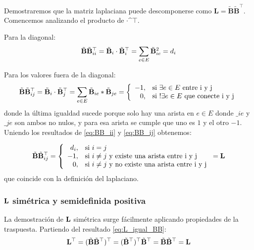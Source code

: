 \documentclass{article}
\begin{document}
Demostraremos que la matriz laplaciana puede descomponerse como $\mathbf{L}=\tilde{\mathbf{B}}\tilde{\mathbf{B}}^\top$. Comencemos analizando el producto de $\bm\cdot\bm^\top$.

Para la diagonal:
\begin{equation}
    \label{eq:BB_ii}
    \tilde{\mathbf{B}}\tilde{\mathbf{B}}^\top_{ii} = \tilde{\mathbf{B}}_i \cdot \tilde{\mathbf{B}}_i^\top = \sum_{e\in E} \tilde{\mathbf{B}}_{ie}^2 = d_i
\end{equation}

Para los valores fuera de la diagonal:
\begin{equation}
    \label{eq:BB_ij}
    \tilde{\mathbf{B}}\tilde{\mathbf{B}}^\top_{ij} = \tilde{\mathbf{B}}_i\cdot\tilde{\mathbf{B}}_j^\top = \sum_{e\in E} \tilde{\mathbf{B}}_{ie} * \tilde{\mathbf{B}}_{je} = \left\lbrace
    \begin{array}{r l}
        -1, & \text{si $\exists e\in E$ entre i y j}         \\
        0,  & \text{si $!\exists e \in E$ que conecte i y j}
    \end{array}
    \right.
\end{equation}
donde la última igualdad sucede porque solo hay una arista en $e \in E$ donde
$\bm_{ie}$ y $\bm_{je}$ son ambos no nulos, y para esa arista se cumple que uno es
$1$ y el otro $-1$. Uniendo los resultados de \eqref{eq:BB_ii} y \eqref{eq:BB_ij} obtenemos:

\begin{equation}
    \label{eq:L_igual_BB}
    \tilde{\mathbf{B}}\tilde{\mathbf{B}}^\top_{ij} = \left\lbrace
    \begin{array}{r l}
        d_i, & \text{si $i=j$}                                        \\
        -1,  & \text{si $i\neq j$ y existe una arista entre i y j}    \\
        0,   & \text{si $i\neq j$ y no existe una arista entre i y j}
    \end{array}
    \right. = \mathbf{L}
\end{equation}
que coincide con la definición del laplaciano.

\subsubsection{$\mathbf{L}$ simétrica y semidefinida positiva}

La demostración de $\mathbf{L}$ simétrica surge fácilmente aplicando propiedades de la traspuesta. Partiendo del resultado \eqref{eq:L_igual_BB}:
\begin{equation}
    \mathbf{L}^\top = (\tilde{\mathbf{B}}\tilde{\mathbf{B}}^\top)^\top = (\tilde{\mathbf{B}}^\top)^\top \tilde{\mathbf{B}}^\top = \tilde{\mathbf{B}}\tilde{\mathbf{B}}^\top = \mathbf{L}
\end{equation}
\end{document}
